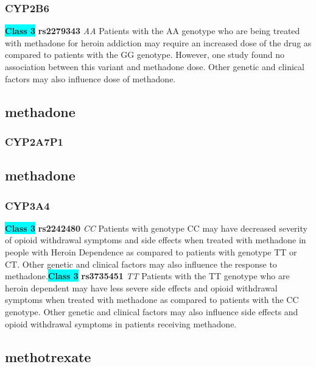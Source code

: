 \documentclass{book}
\begin{document}
\subsubsection{ CYP2B6 }

\begin{center}
\textbf{\colorbox{cyan} {Class 3}} \textbf{ rs2279343 } \textit{ AA }
Patients with the AA genotype who are being treated with methadone for heroin addiction may require an increased dose of the drug as compared to patients with the GG genotype. However, one study found no association between this variant and methadone dose. Other genetic and clinical factors may also influence dose of methadone.


\end{center}\subsection{ methadone }


\subsubsection{ CYP2A7P1 }

\begin{center}



\end{center}\subsection{ methadone }


\subsubsection{ CYP3A4 }

\begin{center}
\textbf{\colorbox{cyan} {Class 3}} \textbf{ rs2242480 } \textit{ CC }
Patients with genotype CC may have decreased severity of opioid withdrawal symptoms and side effects when treated with methadone in people with Heroin Dependence as compared to patients with genotype TT or CT. Other genetic and clinical factors may also influence the response to methadone.\textbf{\colorbox{cyan} {Class 3}} \textbf{ rs3735451 } \textit{ TT }
Patients with the TT genotype who are heroin dependent may have less severe side effects and opioid withdrawal symptoms when treated with methadone as compared to patients with the CC genotype. Other genetic and clinical factors may also influence side effects and opioid withdrawal symptoms in patients receiving methadone.


\end{center}\subsection{ methotrexate }
\end{document}

